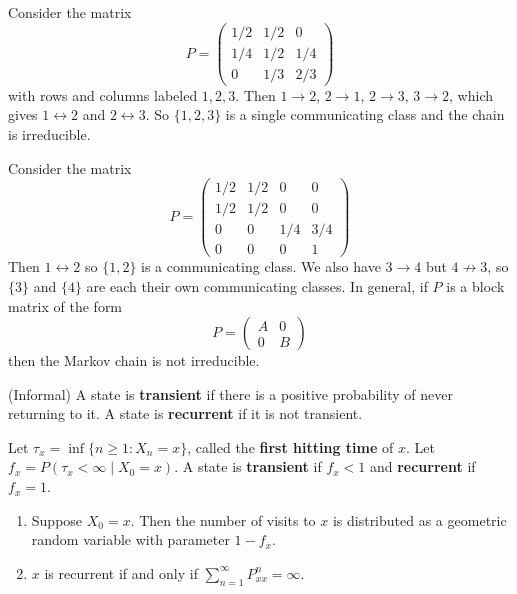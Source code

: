 \documentclass{ximera}
\begin{document}
\begin{example}
Consider the matrix
\[
P = \begin{pmatrix} 1/2 & 1/2 & 0 \\ 1/4 & 1/2 & 1/4 \\ 0 & 1/3 & 2/3 \end{pmatrix}
\]
with rows and columns labeled $1, 2, 3$. Then $1 \to 2$, $2 \to 1$, $2 \to 3$, $3 \to 2$, which gives $1 \leftrightarrow 2$ and $2 \leftrightarrow 3$. So $\{1, 2, 3\}$ is a single communicating class and the chain is irreducible.
\end{example}

\begin{example}
Consider the matrix
\[
P = \begin{pmatrix} 1/2 & 1/2 & 0 & 0 \\ 1/2 & 1/2 & 0 & 0 \\ 0 & 0 & 1/4 & 3/4 \\ 0 & 0 & 0 & 1 \end{pmatrix}
\]
Then $1 \leftrightarrow 2$ so $\{1,2\}$ is a communicating class. We also have $3 \to 4$ but $4 \not\to 3$, so $\{3\}$ and $\{4\}$ are each their own communicating classes. In general, if $P$ is a block matrix of the form
\[
P = \begin{pmatrix} A & 0 \\ 0 & B \end{pmatrix}
\]
then the Markov chain is not irreducible.
\end{example}

\begin{definition}
(Informal) A state is \textbf{transient} if there is a positive probability of never returning to it. A state is \textbf{recurrent} if it is not transient.
\end{definition}

\begin{definition}
Let $\tau_x = \inf\{n \geq 1 : X_n = x\}$, called the \textbf{first hitting time} of $x$. Let $f_x = P(\tau_x < \infty \mid X_0 = x)$. A state is \textbf{transient} if $f_x < 1$ and \textbf{recurrent} if $f_x = 1$.
\end{definition}

\begin{theorem}
\begin{enumerate}[label=(\alph*)]
\item Suppose $X_0 = x$. Then the number of visits to $x$ is distributed as a geometric random variable with parameter $1 - f_x$.
\item $x$ is recurrent if and only if $\displaystyle\sum_{n=1}^{\infty} P^n_{xx} = \infty$.
\end{enumerate}
\end{theorem}
\end{document}
